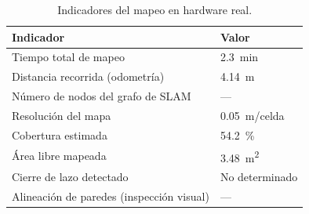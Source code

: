 \begin{table}[H]
\centering
\caption{Indicadores del mapeo en hardware real.}
\label{tab:slam_real_indicadores}
\begin{tabular}{ll}
\hline
\textbf{Indicador} & \textbf{Valor} \\
\hline
Tiempo total de mapeo                  & 2.3~min \\
Distancia recorrida (odometría)        & 4.14~m \\
Número de nodos del grafo de SLAM      & --- \\
Resolución del mapa                    & 0.05~m/celda \\
Cobertura estimada                     & 54.2~\% \\
Área libre mapeada                     & 3.48~m\textsuperscript{2} \\
Cierre de lazo detectado               & No determinado \\
Alineaci\'on de paredes (inspecci\'on visual) & --- \\
\hline
\end{tabular}
\end{table}